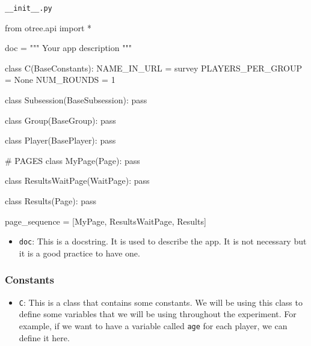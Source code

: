 \documentclass[
  letterpaper,
  DIV=11,
  numbers=noendperiod]{scrreprt}
\newenvironment{Shaded}{\begin{snugshade}}{\end{snugshade}}
\newcommand{\CommentTok}[1]{\textcolor[rgb]{0.37,0.37,0.37}{#1}}
\newcommand{\ControlFlowTok}[1]{\textcolor[rgb]{0.00,0.23,0.31}{#1}}
\newcommand{\DecValTok}[1]{\textcolor[rgb]{0.68,0.00,0.00}{#1}}
\newcommand{\ImportTok}[1]{\textcolor[rgb]{0.00,0.46,0.62}{#1}}
\newcommand{\KeywordTok}[1]{\textcolor[rgb]{0.00,0.23,0.31}{#1}}
\newcommand{\NormalTok}[1]{\textcolor[rgb]{0.00,0.23,0.31}{#1}}
\newcommand{\OperatorTok}[1]{\textcolor[rgb]{0.37,0.37,0.37}{#1}}
\newcommand{\StringTok}[1]{\textcolor[rgb]{0.13,0.47,0.30}{#1}}
\newcommand{\VariableTok}[1]{\textcolor[rgb]{0.07,0.07,0.07}{#1}}
\providecommand{\tightlist}{%
  \setlength{\itemsep}{0pt}\setlength{\parskip}{0pt}}\usepackage{longtable,booktabs,array}
\begin{document}
\begin{codelisting}

\caption{\texttt{__init__.py}}

\begin{Shaded}
\begin{Highlighting}[]
\ImportTok{from}\NormalTok{ otree.api }\ImportTok{import} \OperatorTok{*}


\NormalTok{doc }\OperatorTok{=} \StringTok{"""}
\StringTok{Your app description}
\StringTok{"""}


\KeywordTok{class}\NormalTok{ C(BaseConstants):}
\NormalTok{    NAME\_IN\_URL }\OperatorTok{=} \StringTok{\textquotesingle{}survey\textquotesingle{}}
\NormalTok{    PLAYERS\_PER\_GROUP }\OperatorTok{=} \VariableTok{None}
\NormalTok{    NUM\_ROUNDS }\OperatorTok{=} \DecValTok{1}


\KeywordTok{class}\NormalTok{ Subsession(BaseSubsession):}
    \ControlFlowTok{pass}


\KeywordTok{class}\NormalTok{ Group(BaseGroup):}
    \ControlFlowTok{pass}


\KeywordTok{class}\NormalTok{ Player(BasePlayer):}
    \ControlFlowTok{pass}


\CommentTok{\# PAGES}
\KeywordTok{class}\NormalTok{ MyPage(Page):}
    \ControlFlowTok{pass}


\KeywordTok{class}\NormalTok{ ResultsWaitPage(WaitPage):}
    \ControlFlowTok{pass}


\KeywordTok{class}\NormalTok{ Results(Page):}
    \ControlFlowTok{pass}


\NormalTok{page\_sequence }\OperatorTok{=}\NormalTok{ [MyPage, ResultsWaitPage, Results]}
\end{Highlighting}
\end{Shaded}

\end{codelisting}

\begin{itemize}
\tightlist
\item
  \texttt{doc}: This is a docstring. It is used to describe the app. It
  is not necessary but it is a good practice to have one.
\end{itemize}

\hypertarget{constants}{%
\subsubsection{Constants}\label{constants}}

\begin{itemize}
\tightlist
\item
  \texttt{C}: This is a class that contains some constants. We will be
  using this class to define some variables that we will be using
  throughout the experiment. For example, if we want to have a variable
  called \texttt{age} for each player, we can define it here.
\end{itemize}
\end{document}
